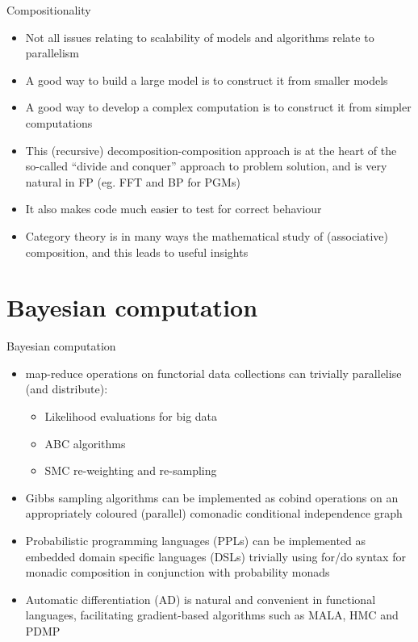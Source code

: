 \documentclass[mathserif,handout]{beamer}
\begin{document}
\begin{frame}{Compositionality}
\protect\hypertarget{compositionality}{}

\begin{itemize}

\item
  Not all issues relating to scalability of models and algorithms relate
  to parallelism
\item
  A good way to build a large model is to construct it from smaller
  models
\item
  A good way to develop a complex computation is to construct it from
  simpler computations
\item
  This (recursive) decomposition-composition approach is at the heart of
  the so-called ``divide and conquer'' approach to problem solution, and
  is very natural in FP (eg. FFT and BP for PGMs)
\item
  It also makes code much easier to \alert{test} for correct behaviour
\item
  Category theory is in many ways the mathematical study of
  (associative) composition, and this leads to useful insights
\end{itemize}

\end{frame}

\section{Bayesian computation}

\begin{frame}{Bayesian computation}
\protect\hypertarget{bayesian-computation}{}

\begin{itemize}

\item
  \alert{map-reduce} operations on \alert{functorial} data collections can
  trivially parallelise (and distribute):

  \begin{itemize}
  
  \item
    Likelihood evaluations for big data
  \item
    ABC algorithms
  \item
    SMC re-weighting and re-sampling
  \end{itemize}
\item
  Gibbs sampling algorithms can be implemented as \alert{cobind}
  operations on an appropriately coloured (parallel) \alert{comonadic}
  conditional independence graph
\item
  \alert{Probabilistic programming languages} (PPLs) can be implemented
  as embedded domain specific languages (DSLs) trivially using
  \alert{for/do} syntax for \alert{monadic composition} in conjunction
  with \alert{probability monads}
\item
  \alert{Automatic differentiation} (AD) is
  natural and convenient in functional languages, facilitating gradient-based
  algorithms such as MALA, HMC and PDMP
\end{itemize}

\end{frame}
\end{document}
